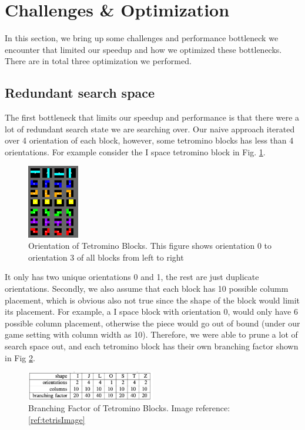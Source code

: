 \section{Challenges \& Optimization}
\vspace{-0.5em}
In this section, we bring up some challenges and performance bottleneck we encounter that limited our speedup and how we optimized these bottlenecks. There are in total three optimization we performed.

\subsection{Redundant search space}
The first bottleneck that limits our speedup and performance is that there were a lot of redundant search state we are searching over. Our naive approach iterated over 4 orientation of each block, however, some tetromino blocks has less than 4 orientations. For example consider the I space tetromino block in Fig. \ref{fig:piece_orientation}.
\begin{figure}[h]
	\centering
	\includegraphics[width=0.2\textwidth]{SRS-pieces.png}
	\vspace{0em}
	\caption{Orientation of Tetromino Blocks. This figure shows orientation 0 to orientation 3 of all blocks from left to right}
	\label{fig:piece_orientation}
\end{figure}
It only has two unique orientations 0 and 1, the rest are just duplicate orientations. Secondly, we also assume that each block has 10 possible columm placement, which is obvious also not true since the shape of the block would limit its placement. For example, a I space block with orientation 0, would only have 6 possible column placement, otherwise the piece would go out of bound (under our game setting with column width as 10). Therefore, we were able to prune a lot of search space out, and each tetromino block has their own branching factor shown in Fig \ref{fig:tetris_table}.
\begin{figure}[h]
	\centering
	\includegraphics[width=0.5\textwidth]{tetris_table.png}
	\vspace{-1em}
	\caption{Branching Factor of Tetromino Blocks. Image reference: \ref{ref:tetrisImage}}
	\label{fig:tetris_table}
\end{figure}


